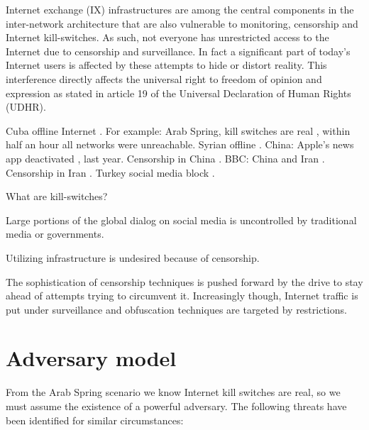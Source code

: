 Internet exchange (IX) infrastructures are among the central components in the inter-network architecture that are also vulnerable to monitoring, censorship and Internet kill-switches.
As such, not everyone has unrestricted access to the Internet due to censorship and surveillance.
In fact a significant part of today's Internet users is affected by these attempts to hide or distort reality. %
This interference directly affects the universal right to freedom of opinion and expression as stated in article 19 of the Universal Declaration of Human Rights (UDHR).

Cuba offline Internet \cite{watts2014havana}.
For example: Arab Spring, kill switches are real \cite{renesys2011egypt}, within half an hour all networks were unreachable. Syrian offline \cite{renesys2012syria}.
China: Apple's news app deactivated \cite{nyt2015appleChina}, last year. Censorship in China \cite{hrw2006china}.
BBC: China and Iran \cite{kathuria2010bypassing}. Censorship in Iran \cite{halderman2013iran}.
Turkey social media block \cite{twitter2015turkey}.

What are kill-switches?


Large portions of the global dialog on social media is uncontrolled by traditional media or governments.

Utilizing infrastructure is undesired because of censorship.


The sophistication of censorship techniques is pushed forward by the drive to stay ahead of attempts trying to circumvent it.
Increasingly though, Internet traffic is put under surveillance and obfuscation techniques are targeted by restrictions.


\section{Adversary model}\label{sec:adversary_model}
From the Arab Spring scenario we know Internet kill switches are real, so we must assume the existence of a powerful adversary.
The following threats \cite{ietf-shadow-internet} have been identified for similar circumstances:

